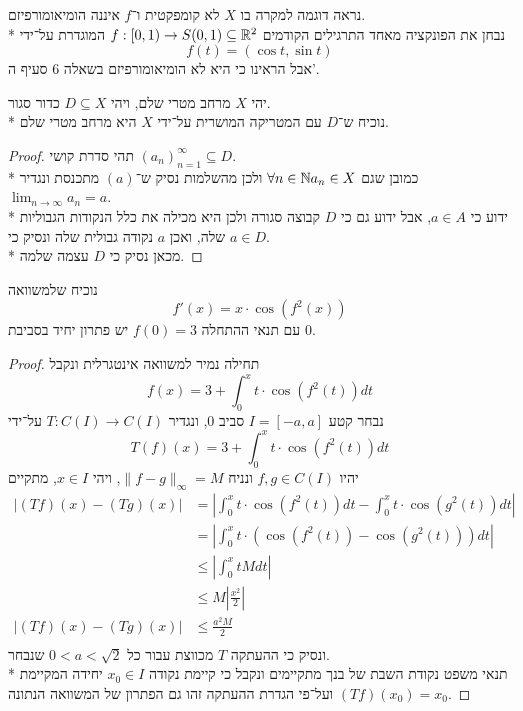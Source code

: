\Subquestion{}
נראה דוגמה למקרה בו $X$ לא קומפקטית ו־$f$ איננה הומיאומורפיזם. \\*
נבחן את הפונקציה מאחד התרגילים הקודמים $f : [0, 1) \to S(0, 1) \subseteq \mathbb{R}^2$ המוגדרת על־ידי %
\[
	f(t) = (\cos t, \sin t)
\]
אבל הראינו כי היא לא הומיאומורפיזם בשאלה 6 סעיף ה'.

\Question{}
\Subquestion{}
יהי $X$ מרחב מטרי שלם, ויהי $D \subseteq X$ כדור סגור. \\*
נוכיח ש־$D$ עם המטריקה המושרית על־ידי $X$ היא מרחב מטרי שלם.
\begin{proof}
	תהי סדרת קושי ${(a_n)}_{n = 1}^\infty \subseteq D$. \\*
	כמובן שגם $\forall n \in \mathbb{N} a_n \in X$ ולכן מהשלמות נסיק ש־$(a)$ מתכנסת ונגדיר $\lim_{n \to \infty} a_n = a$. \\*
	ידוע כי $a \in A$, אבל ידוע גם כי  $D$ קבוצה סגורה ולכן היא מכילה את כלל הנקודות הגבוליות שלה, ואכן $a$ נקודה גבולית שלה ונסיק כי $a \in D$. \\*
	מכאן נסיק כי $D$ עצמה שלמה.
\end{proof}

\Subquestion{}
נוכיח שלמשוואה
\[
	f'(x) = x \cdot \cos (f^2(x))
\]
עם תנאי ההתחלה $f(0) = 3$ יש פתרון יחיד בסביבת $0$.
\begin{proof}
	תחילה נמיר למשוואה אינטגרלית ונקבל
	\[
		f(x) = 3 + \int_{0}^{x} t \cdot \cos(f^2(t)) dt
	\]
	נבחר קטע $I = [-a, a]$ סביב $0$, ונגדיר $T : C(I) \to C(I)$ על־ידי
	\[
		T(f)(x) = 3 + \int_{0}^{x} t \cdot \cos(f^2(t)) dt
	\]
	יהיו $f, g \in C(I)$ ונניח $\lVert f - g \rVert_\infty = M$, ויהי $x \in I$, מתקיים
	\begin{align*}
		| (Tf)(x) - (Tg)(x) |
		& = | \int_{0}^{x} t \cdot \cos(f^2(t)) dt - \int_{0}^{x} t \cdot \cos(g^2(t)) dt | \\
		& = | \int_{0}^{x} t \cdot (\cos(f^2(t)) - \cos(g^2(t))) dt | \\
		& \le | \int_{0}^{x} t M dt | \\
		& \le M | \frac{x^2}{2} | \\
		| (Tf)(x) - (Tg)(x) |
		& \le \frac{a^2 M}{2} \\
	\end{align*}
	ונסיק כי ההעתקה $T$ מכווצת עבור כל $0 < a < \sqrt{2}$ שנבחר. \\*
	תנאי משפט נקודת השבת של בנך מתקיימים ונקבל כי קיימת נקודה $x_0 \in I$ יחידה המקיימת $(Tf)(x_0) = x_0$ ועל־פי הגדרת ההעתקה זהו גם הפתרון של המשוואה הנתונה.
\end{proof}

